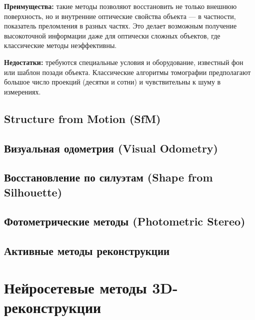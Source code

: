 \textbf{Преимущества:} такие методы позволяют восстановить не только внешнюю
поверхность, но и внутренние оптические свойства объекта — в частности,
показатель преломления в разных частях. Это делает возможным получение
высокоточной информации даже для оптически сложных объектов, где классические методы
неэффективны.

\textbf{Недостатки:} требуются специальные условия и оборудование,
известный фон или шаблон позади объекта. Классические алгоритмы томографии
предполагают большое число проекций (десятки и сотни) и чувствительны
к шуму в измерениях.

\subsection{Structure from Motion (SfM)}
\subsection{Визуальная одометрия (Visual Odometry)}
\subsection{Восстановление по силуэтам (Shape from Silhouette)}
\subsection{Фотометрические методы (Photometric Stereo)}
\subsection{Активные методы реконструкции}

\section{Нейросетевые методы 3D-реконструкции}

